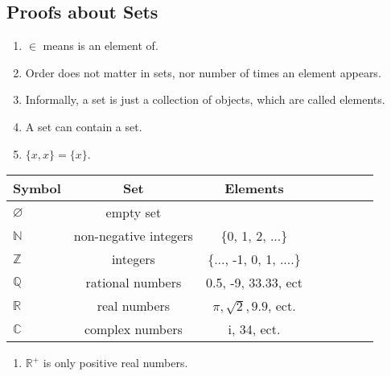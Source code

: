 \documentclass{article}
\begin{document}
\subsection{Proofs about Sets}
\begin{enumerate}
	\item $\in$ means is an element of.
	\item Order does not matter in sets, nor number of times an element appears.
	\item Informally, a set is just a collection of objects, which are called elements.
	\item A set can contain a set.
	\item $\{x, x\} = \{x\}$.
\end{enumerate}

\begin{tabular}{l*{6}{c}r}
Symbol          & Set & Elements\\
\hline
$\varnothing$ & empty set & \\
$\mathbb{N}$ & non-negative integers& \{0, 1, 2, ...\}  \\
$\mathbb{Z}$ & integers& \{..., -1, 0, 1, ....\}  \\
$\mathbb{Q}$ & rational numbers & 0.5, -9, 33.33, ect  \\
$\mathbb{R}$   &  real numbers & $\pi, \sqrt{2}, 9.9$,  ect. \\
$\mathbb{C}$  & complex numbers &  i, 34, ect.  \\
\end{tabular}
\begin{enumerate}
	\item $\mathbb{R}^{+}$ is only positive real numbers.
\end{enumerate}
\end{document}
